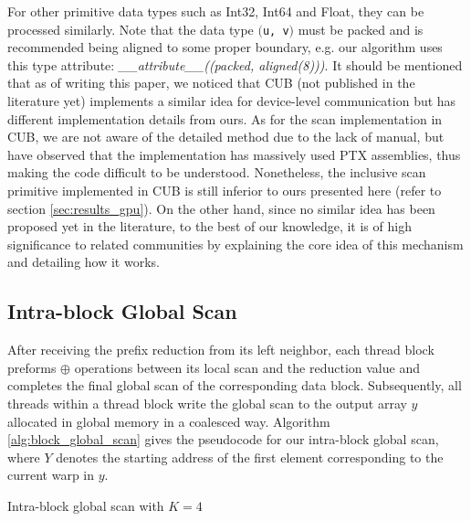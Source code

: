 \documentclass[article]{elsarticle}
\renewcommand{\hl}[1]{#1}
\begin{document}
{For other primitive data types such as Int32, Int64 and Float, they can be processed similarly. Note that the data type \hbox{{\tt $($u, v$)$}} must be packed and is recommended being aligned to some proper boundary, e.g. our algorithm uses this type attribute: \textit{\_\_attribute\_\_((packed, aligned(8)))}. It should be mentioned that as of writing this paper, we noticed that CUB \cite{cub} (not published in the literature yet) implements a similar idea for device-level communication but has different implementation details from ours. \hl{As for the scan implementation in CUB, we are not aware of the detailed method due to the lack of manual, but have observed that the implementation has massively used PTX assemblies, thus making the code difficult to be understood}. Nonetheless, the inclusive scan primitive implemented in CUB is still inferior to ours presented here (refer to section \ref{sec:results_gpu}). On the other hand, since no similar idea has been proposed yet in the literature, to the best of our knowledge, it is of high significance to related communities by explaining the core idea of this mechanism and detailing how it works.
\subsection{Intra-block Global Scan}
After receiving the prefix reduction from its left neighbor, each thread block preforms $\oplus$ operations between its local scan and the reduction value and completes the final global scan of the corresponding data block. Subsequently, all threads within a thread block write the global scan to the output array $y$ allocated in global memory in a coalesced way. Algorithm \ref{alg:block_global_scan} gives the pseudocode for our intra-block global scan, where $Y$ denotes the starting address of the first element corresponding to the current warp in $y$.
\begin{algorithm}[!h]
\caption{Intra-block global scan with $K=4$}
\label{alg:block_global_scan}
\fontsize{8pt}{8.05pt}\selectfont
\begin{algorithmic}[1]

    
\EndProcedure
\end{algorithmic}
\end{algorithm}
}
\end{document}
